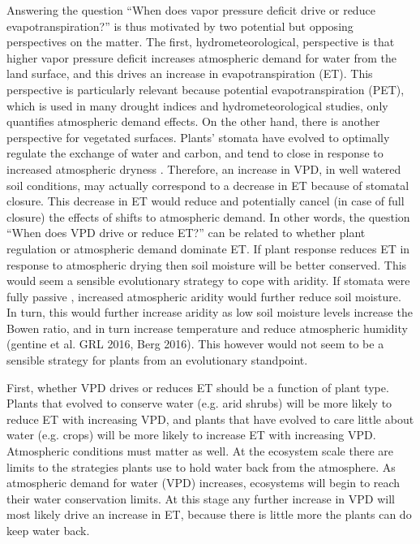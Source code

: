 \documentclass[draft,linenumbers]{agujournal}
\begin{document}
Answering the question ``When does vapor pressure deficit drive or reduce evapotranspiration?'' is thus motivated by two potential but opposing perspectives on the matter. The first, hydrometeorological, perspective is that higher vapor pressure deficit increases atmospheric demand for water from the land surface, and this drives an increase in evapotranspiration (ET). This perspective is particularly relevant because potential evapotranspiration (PET), which is used in many drought indices and hydrometeorological studies, only quantifies atmospheric demand effects. On the other hand, there is another perspective for vegetated surfaces. Plants' stomata have evolved to optimally regulate the exchange of water and carbon, and tend to close in response to increased atmospheric dryness \citep{Ball_1987, Leuning_1990, MEDLYN_2011}.  Therefore, an increase in VPD, in well watered soil conditions, may actually correspond to a decrease in ET because of stomatal closure. This decrease in ET would reduce and potentially cancel (in case of full closure) the effects of shifts to atmospheric demand. In other words, the  question ``When does VPD drive or reduce ET?'' can be related to whether plant regulation or atmospheric demand dominate ET. If plant response reduces ET in response to atmospheric drying then soil moisture will be better conserved. This would seem a sensible evolutionary strategy to cope with aridity. If stomata were fully passive \citep [similar to soil pores, e.g. ][]{Or_2013}, increased atmospheric aridity would further reduce soil moisture. In turn, this would further increase aridity as low soil moisture levels increase the Bowen ratio, and in turn increase temperature and reduce atmospheric humidity (gentine et al. GRL 2016, Berg 2016).  This however would not seem to be a sensible strategy for plants from an evolutionary standpoint.

First, whether VPD drives or reduces ET should be a function of plant type. Plants that evolved to conserve water (e.g. arid shrubs) will be more likely to reduce ET with increasing VPD, and plants that have evolved to care little about water (e.g. crops) will be more likely to increase ET with increasing VPD. Atmospheric conditions must matter as well. At the ecosystem scale there are limits to the strategies plants use to hold water back from the atmosphere. As atmospheric demand for water (VPD) increases, ecosystems will begin to reach their water conservation limits. At this stage any further increase in VPD will most likely drive an increase in ET, because there is little more the plants can do keep water back. 
\end{document}
